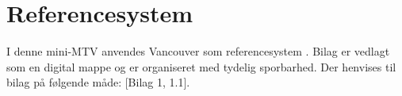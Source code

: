 \section{Referencesystem}
I denne mini-MTV anvendes Vancouver som referencesystem \cite{vancouver}. Bilag er vedlagt som en digital mappe og er organiseret med tydelig sporbarhed. Der henvises til bilag på følgende måde: [Bilag 1, 1.1].


  
	

